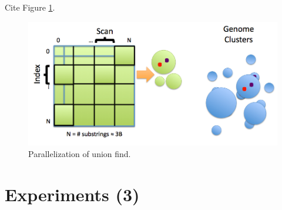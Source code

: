 \documentclass[10pt]{article}
\begin{document}
\begin{itemize}
\begin{itemize}
Cite Figure \ref{fig:parallelUnionFind}.
\begin{figure}
\centering
\includegraphics[scale=0.4]{parallelUnionFind}
\caption{Parallelization of union find.}
\label{fig:parallelUnionFind}
\end{figure}
\end{itemize}
\end{itemize}

\section{Experiments (3)}
\end{document}
